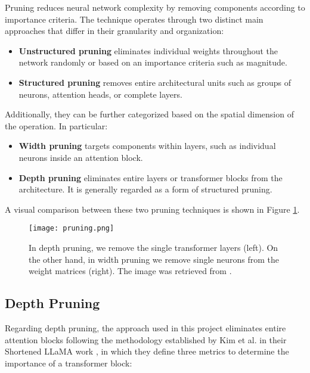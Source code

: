 Pruning reduces neural network complexity by removing components according to importance criteria. The technique operates through two distinct main approaches that differ in their granularity and organization:

\begin{itemize}
    \item \textbf{Unstructured pruning} eliminates individual weights throughout the network randomly or based on an importance criteria such as magnitude.
    \item \textbf{Structured pruning} removes entire architectural units such as groups of neurons, attention heads, or complete layers.
\end{itemize}

Additionally, they can be further categorized based on the spatial dimension of the operation. In particular:
\begin{itemize}
    \item \textbf{Width pruning} targets components within layers, such as individual neurons inside an attention block.
    \item \textbf{Depth pruning} eliminates entire layers or transformer blocks from the architecture. It is generally regarded as a form of structured pruning.
\end{itemize}

A visual comparison between these two pruning techniques is shown in Figure \ref{fig:pruning_comparison}.

\begin{figure}[htbp]
    \centering
    \texttt{[image: pruning.png]}
    \caption[Comparison of Depth and Width Pruning]{In depth pruning, we remove the single transformer layers (left). On the other hand, in width pruning we remove single neurons from the weight matrices (right). The image was retrieved from \cite{shortened_llama}.}
    \label{fig:pruning_comparison}
\end{figure}

\subsection{Depth Pruning} \label{depth_pruning}

Regarding depth pruning, the approach used in this project eliminates entire attention blocks following the methodology established by Kim et al. in their Shortened LLaMA work \cite{shortened_llama}, in which they define three metrics to determine the importance of a transformer block:

